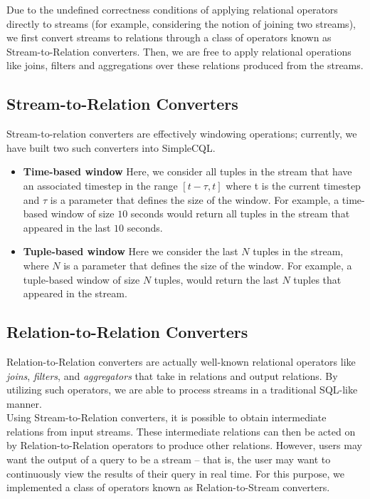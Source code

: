 \documentclass[a4paper, 10pt, conference]{IEEEconf}
\begin{document}
Due to the undefined correctness conditions of applying relational operators directly to streams (for example, considering the notion of joining two streams), we first convert streams to relations through a class of operators known as Stream-to-Relation converters. Then, we are free to apply relational operations like joins, filters and aggregations over these relations produced from the streams. 

\subsection{Stream-to-Relation Converters}
Stream-to-relation converters are effectively windowing operations; currently, we have built two such converters into SimpleCQL.

\begin{itemize}
\item \textbf{Time-based window} Here, we consider all tuples in the stream that have an associated timestep in the range $[t-\tau, t]$ where t is the current timestep and $\tau$ is a parameter that defines the size of the window. For example, a time-based window of size $10$ seconds would return all tuples in the stream that appeared in the last $10$ seconds.

\item \textbf{Tuple-based window} Here we consider the last $N$ tuples in the stream, where $N$ is a parameter that defines the size of the window. For example, a tuple-based window of size $N$ tuples, would return the last $N$ tuples that appeared in the stream.
\end{itemize}

\subsection{Relation-to-Relation Converters}

Relation-to-Relation converters are actually well-known relational operators like \textit{joins}, \textit{filters}, and \textit{aggregators} that take in relations and output relations. By utilizing such operators, we are able to process streams in a traditional SQL-like manner.
\\

Using Stream-to-Relation converters, it is possible to obtain intermediate relations from input streams. These intermediate relations can then be acted on by Relation-to-Relation operators to produce other relations. However, users may want the output of a query to be a stream -- that is, the user may want to continuously view the results of their query in real time. For this purpose, we implemented a class of operators known as Relation-to-Stream converters.
\end{document}
